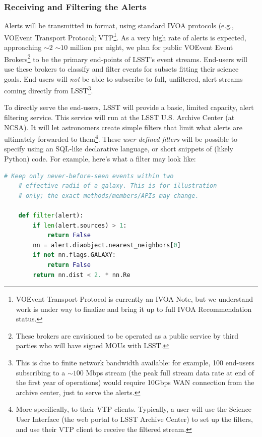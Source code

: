 \documentclass[SE,lsstdraft,toc]{lsstdoc}
\newcommand{\oldtext}[1]{{\color{red} #1}}
\newcommand{\newtext}[1]{{\color{blue} #1}}
\newcommand{\marginreq}[1]{\marginpar{\hspace{0pt}\tiny #1}}
\newcommand{\dmreq}[1]{\marginreq{DMS-REQ-#1}}
\begin{document}
\subsubsection{Receiving and Filtering the Alerts}
\label{sec:eventbrokers}

Alerts will be transmitted in \VOEvent format, using standard IVOA protocols\dmreq{0002} (e.g., VOEvent Transport Protocol; VTP\footnote{VOEvent Transport Protocol is currently an IVOA Note, but we understand work is under way to finalize and bring it up to full IVOA Recommendation status.}. As a very high rate of alerts is expected, approaching \oldtext{$\sim 2$} \newtext{$\sim 10$} million per night, we plan for public VOEvent Event Brokers\footnote{These brokers are envisioned to be operated as a public service by third parties who will have signed MOUs with LSST.} to be the primary end-points of LSST's event streams. End-users will use these brokers to classify and filter events for subsets fitting their science goals. End-users will \emph{not} be able to subscribe to full, unfiltered, alert streams coming directly from LSST\footnote{This is due to finite network bandwidth available: for example, 100 end-users subscribing to a $\sim 100$ Mbps stream (the peak full stream data rate at end of the first year of operations) would require 10Gbps WAN connection from the archive center, just to serve the alerts.}.

To directly serve the end-users, LSST will provide a basic, limited capacity, alert filtering service.\dmreq{0342} This service will run at the LSST U.S. Archive Center (at NCSA). It will let astronomers create simple filters that limit what alerts are ultimately forwarded to them\footnote{More specifically, to their VTP clients. Typically, a user will use the Science User Interface (the web portal to LSST Archive Center) to set up the filters, and use their VTP client to receive the filtered \VOEvent stream.}. These \emph{user defined filters} will be possible to specify using an SQL-like declarative language, or short snippets of (likely Python) code. For example, here's what a filter may look like:

\begin{lstlisting}[language=python,commentstyle=\bfseries\color{green!40!black}]
    # Keep only never-before-seen events within two
    # effective radii of a galaxy. This is for illustration
    # only; the exact methods/members/APIs may change.

    def filter(alert):
        if len(alert.sources) > 1:
            return False
        nn = alert.diaobject.nearest_neighbors[0]
        if not nn.flags.GALAXY:
            return False
        return nn.dist < 2. * nn.Re
\end{lstlisting}
\end{document}
